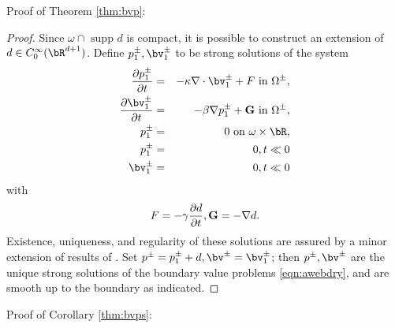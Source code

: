 
Proof of Theorem \ref{thm:bvp}:

\begin{proof}
Since $\omega \cap \mbox{ supp }d$ is compact, it is possible to construct an extension of 
$d \in C^{\infty}_{0}(\bR^{d+1})$. Define $p_1^{\pm}, \bv_1^{\pm}$ to be strong solutions of the system
\begin{eqnarray}
\label{eqn:ichom}
\frac{\partial p^{\pm}_1}{\partial t} & = & - \kappa \nabla \cdot \bv^{\pm}_1 + F\mbox{ in } \Omega^{\pm}, \nonumber \\
\frac{\partial \bv^{\pm}_1}{\partial t} & = & - \beta \nabla p^{\pm}_1 + {\bf G}\mbox{ in } \Omega^{\pm},\nonumber \\
p^{\pm}_1 & = & 0 \mbox{ on } \omega \times \bR,\\
p^{\pm}_1 & = & 0, t \ll 0\\
\bv^{\pm}_1 & = & 0, t \ll 0 
\end{eqnarray}
with 
\[
F = -\gamma\frac{\partial d}{\partial t}, {\bf G} = -\nabla d.
\]
Existence, uniqueness, and regularity of these solutions are assured by a minor extension of results of \cite{BlazekStolkSymes:13}.
Set $p^{\pm} = p_1^{\pm} + d, \bv^{\pm} = \bv_1^{\pm}$; then $p^{\pm},\bv^{\pm}$ are the unique strong solutions of the boundary value problems \ref{eqn:awebdry}, and are smooth up to the boundary as indicated. 
\end{proof}

Proof of Corollary \ref{thm:bvps}:

